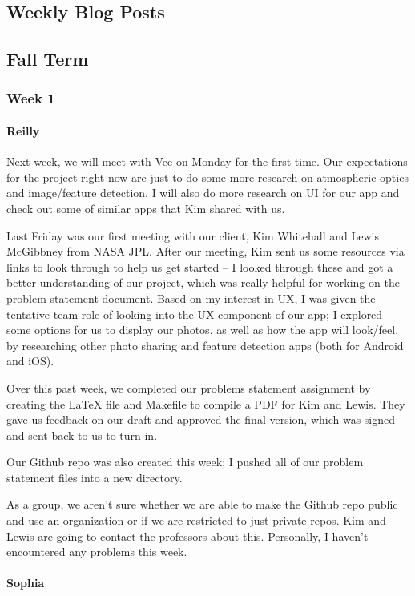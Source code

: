 \documentclass[onecolumn, draftclsnofoot,10pt, compsoc]{IEEEtran}
\begin{document}
\begin{flushleft}
 
\section{Weekly Blog Posts} 
\subsection{Fall Term}
\subsubsection{Week 1}
\paragraph{Reilly}
 
Next week, we will meet with Vee on Monday for the first time. Our expectations for the project right now are just to do some more research on atmospheric optics and image/feature detection. I will also do more research on UI for our app and check out some of similar apps that Kim shared with us.
 
Last Friday was our first meeting with our client, Kim Whitehall and Lewis McGibbney from NASA JPL. After our meeting, Kim sent us some resources via links to look through to help us get started – I looked through these and got a better understanding of our project, which was really helpful for working on the problem statement document. Based on my interest in UX, I was given the tentative team role of looking into the UX component of our app; I explored some options for us to display our photos, as well as how the app will look/feel, by researching other photo sharing and feature detection apps (both for Android and iOS).
 
Over this past week, we completed our problems statement assignment by creating the LaTeX file and Makefile to compile a PDF for Kim and Lewis. They gave us feedback on our draft and approved the final version, which was signed and sent back to us to turn in.
 
Our Github repo was also created this week; I pushed all of our problem statement files into a new directory.
 
 
As a group, we aren't sure whether we are able to make the Github repo public and use an organization or if we are restricted to just private repos. Kim and Lewis are going to contact the professors about this. Personally, I haven't encountered any problems this week.
 
\paragraph{Sophia}
 

\end{flushleft}
\end{document}
